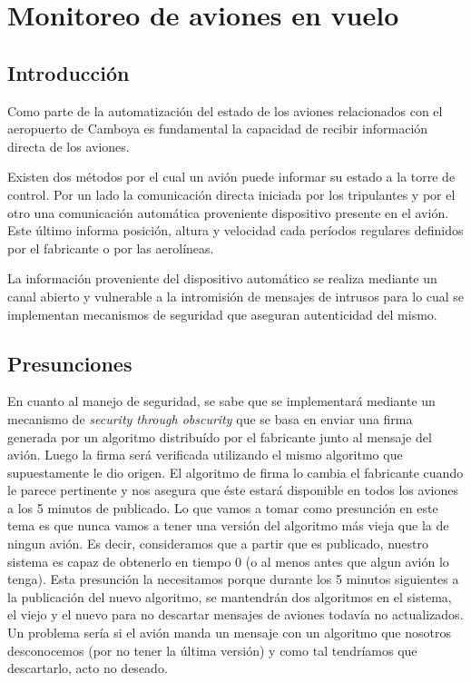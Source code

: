 \section{Monitoreo de aviones en vuelo}
\subsection{Introducción}
Como parte de la automatización del estado de los aviones relacionados con el aeropuerto de Camboya es fundamental la capacidad de recibir información directa de los aviones.

Existen dos métodos por el cual un avión puede informar su estado a la torre de control. Por un lado la comunicación directa iniciada por los tripulantes y por el otro una comunicación automática proveniente dispositivo presente en el avión. Este último informa posición, altura y velocidad cada períodos regulares definidos por el fabricante o por las aerolíneas.

La información proveniente del dispositivo automático se realiza mediante un canal abierto y vulnerable a la intromisión de mensajes de intrusos para lo cual se implementan mecanismos de seguridad que aseguran autenticidad del mismo.

\subsection{Presunciones}
En cuanto al manejo de seguridad, se sabe que se implementará mediante un mecanismo de \emph{security through obscurity} que se basa en enviar una firma generada por un algoritmo distribuído por el fabricante junto al mensaje del avión. Luego la firma será verificada utilizando el mismo algoritmo que supuestamente le dio origen. El algoritmo de firma lo cambia el fabricante cuando le parece pertinente y nos asegura que éste estará disponible en todos los aviones a los 5 minutos de publicado. Lo que vamos a tomar como presunción en este tema es que nunca vamos a tener una versión del algoritmo más vieja que la de ningun avión. Es decir, consideramos que a partir que es publicado, nuestro sistema es capaz de obtenerlo en tiempo 0 (o al menos antes que algun avión lo tenga). Esta presunción la necesitamos porque durante los 5 minutos siguientes a la publicación del nuevo algoritmo, se mantendrán dos algoritmos en el sistema, el viejo y el nuevo para no descartar mensajes de aviones todavía no actualizados. Un problema sería si el avión manda un mensaje con un algoritmo que nosotros desconocemos (por no tener la última versión) y como tal tendríamos que descartarlo, acto no deseado.

